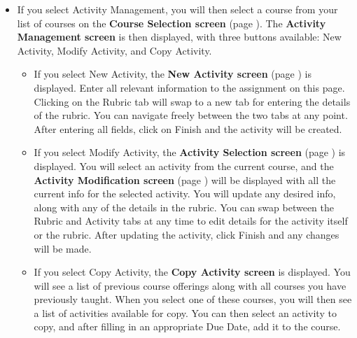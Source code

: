 \documentclass{article}
\begin{document}
\begin{itemize}
\begin{itemize}
\begin{itemize}
\begin{itemize}
	  \end{itemize}
	\end{itemize}
      \item If you select Activity Management, you will then select a course from your
	list of courses on the \textbf{Course Selection screen} (page \pageref{courseSel}). The \textbf{Activity 
	  Management screen} is then displayed, with three buttons available: New 
	Activity, Modify Activity, and Copy Activity.
	\begin{itemize}
	\item If you select New Activity, the \textbf{New Activity screen} 
	  (page \pageref{newActivity}) is displayed.
	  Enter all relevant information to the assignment on this page. Clicking on
	  the Rubric tab will swap to a new tab for entering the details of the rubric.
	  You can navigate freely between the two tabs at any point. After entering
	  all fields, click on Finish and the activity will be created.
	\item If you select Modify Activity, the \textbf{Activity Selection screen} (page \pageref{actSel}) is
	  displayed. You will select an activity from the current course, and the
	  \textbf{Activity Modification screen} (page \pageref{newActivity}) 
	  will be displayed with all the current
	  info for the selected activity. You will update any desired info, along with
	  any of the details in the rubric. You can swap between the Rubric and 
	  Activity tabs at any time to edit details for the activity itself or
          the rubric.
	  After updating the activity, click Finish and any changes will be made.
	\item If you select Copy Activity, the \textbf{Copy Activity screen}
          is displayed.
	  You will see a list of previous course offerings along with all courses you
	  have previously taught. When you select one of these courses, you will
	  then see a list of activities available for copy. You can then select an
	  activity to copy, and after filling in an appropriate Due Date, add 
	  it to the course.
	\end{itemize}
    \end{itemize}
\end{itemize}
\end{document}
